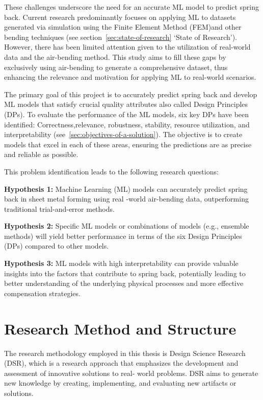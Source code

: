 These challenges underscore the need for an accurate ML model to predict spring back.
Current research predominantly focuses on applying ML to datasets generated via simulation using the Finite Element
Method (FEM)and other bending techniques (see section~\ref{sec:state-of-research} `State of Research').
However, there has been limited attention given to the utilization of real-world data and the air-bending method.
This study aims to fill these gaps by exclusively using air-bending to generate a comprehensive dataset, thus
enhancing the relevance and motivation for applying ML to real-world scenarios.

The primary goal of this project is to accurately predict spring back and develop \ac{ML} models that satisfy crucial
quality attributes also called Design Principles (DPs).
To evaluate the performance of the ML models, six key DPs have been identified:
Correctness,relevance, robustness, stability, resource utilization, and interpretability
(see~\ref{sec:objectives-of-a-solution}).
The objective is to create models that excel in each of these areas, ensuring the predictions are as precise and
reliable as possible.

This problem identification leads to the following research questions:

\begin{tcolorbox}[arc=0pt,boxrule=0.5pt]
    \textbf{Hypothesis 1:} Machine Learning (ML) models can accurately predict spring back in sheet metal forming using
    real -world air-bending data, outperforming traditional trial-and-error methods.

    \textbf{Hypothesis 2:} Specific ML models or combinations of models (e.g., ensemble methods) will yield better
    performance
    in terms of the six Design Principles (DPs) compared to other models.

    \textbf{Hypothesis 3:} ML models with high interpretability can provide valuable insights into the factors that
    contribute to spring back, potentially leading to better understanding of the underlying physical processes and
    more effective compensation strategies.
\end{tcolorbox}


\section{Research Method and Structure}\label{sec:research-method-and-structure}
The research methodology employed in this thesis is Design Science Research (DSR), which is a
research approach that emphasizes the development and assessment of innovative solutions to real-
world problems.
DSR aims to generate new knowledge by creating, implementing, and evaluating new artifacts or
solutions.

